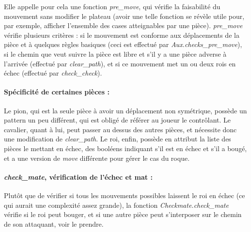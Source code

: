 \documentclass[a4paper]{article}
\begin{document}
Elle appelle pour cela une fonction \textit{pre\_move}, qui vérifie la faisabilité du mouvement sans modifier le plateau (avoir une telle fonction se révèle utile pour, par exemple, afficher l'ensemble des cases atteignables par une pièce).
\textit{pre\_move} vérifie plusieurs critères : si le mouvement est conforme aux déplacements de la pièce et à quelques règles basiques (ceci est effectué par \textit{Aux.checks\_pre\_move}), si le chemin que veut suivre la pièce est libre et s'il y a une pièce adverse à l'arrivée (effectué par \textit{clear\_path}), et si ce mouvement met un ou deux rois en échec (effectué par \textit{check\_check}).

\paragraph{Spécificité de certaines pièces :} Le pion, qui est la seule pièce à avoir un déplacement non symétrique, possède un pattern un peu différent, qui est obligé de référer au joueur le contrôlant.
Le cavalier, quant à lui, peut passer au dessus des autres pièces, et nécessite donc une modification de \textit{clear\_path}.
Le roi, enfin, possède en attribut la liste des pièces le mettant en échec, des booléens indiquant s'il est en échec et s'il a bougé, et a une version de \textit{move} différente pour gérer le cas du roque. 

\paragraph{\textit{check\_mate}, vérification de l'échec et mat :} Plutôt que de vérifier si tous les mouvements possibles laissent le roi en échec (ce qui aurait une complexité assez grande), la fonction \textit{Checkmate.check\_mate} vérifie si le roi peut bouger, et si une autre pièce peut s'interposer sur le chemin de son attaquant, voir le prendre.
\end{document}
